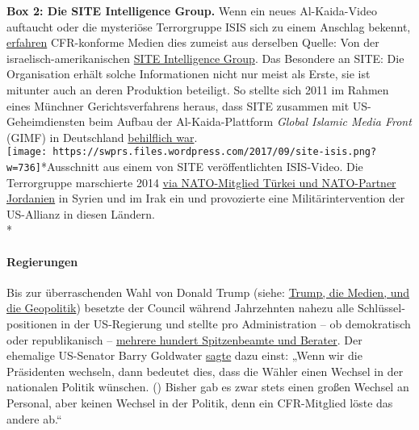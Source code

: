 \textbf{Box 2: Die SITE Intelligence Group.} Wenn ein neues
Al-Kaida-Video auftaucht oder die mysteriöse Terror­gruppe ISIS sich zu
einem Anschlag bekennt,
\href{https://www.hintergrund.de/globales/terrorismus/propaganda-und-wahrheit-die-botschaften-des-osama-bin-laden/}{erfahren}
CFR-konforme Medien dies zumeist aus derselben Quelle: Von der
israelisch-amerikanischen
\href{http://www.globalresearch.ca/who-is-behind-the-islamic-state-is-beheadings-probing-the-site-intelligence-group/5402082}{SITE
Intelligence Group}. Das Besondere an SITE: Die Organisation erhält
solche Informationen nicht nur meist als Erste, sie ist mitunter auch an
deren Produktion beteiligt. So stellte sich 2011 im Rahmen eines
Münchner Gerichtsverfahrens heraus, dass SITE zusammen mit
US-Geheimdiensten beim Aufbau der Al-Kaida-Plattform \emph{Global
Islamic Media Front} (GIMF) in Deutschland
\href{https://www.swr.de/blog/terrorismus/2011/09/09/eklat-im-gimf-verfahren-steuerte-das-fbi-die-zweite-generation/}{behilflich
war}.\\
\texttt{[image: https://swprs.files.wordpress.com/2017/09/site-isis.png?w=736]}*Ausschnitt
aus einem von SITE veröffentlichten ISIS-Video. Die Terrorgruppe
marschierte 2014
\href{https://journal-neo.org/2015/06/09/logistics-101-where-does-isis-get-its-guns/}{via
NATO-Mitglied Türkei und NATO-Partner Jordanien} in Syrien und im Irak
ein und provozierte eine Militärintervention der US-Allianz in diesen
Ländern.\\
*

\hypertarget{regierungen}{%
\paragraph{Regierungen}\label{regierungen}}

Bis zur überraschenden Wahl von Donald Trump (siehe:
\href{https://swprs.org/trump-medien-geopolitik/}{Trump, die Medien, und
die Geopolitik}) besetzte der Council während Jahrzehnten nahezu alle
Schlüssel­positionen in der US-Regierung und stellte pro Administration
-- ob demokratisch oder republikanisch --
\href{https://swprs.files.wordpress.com/2017/07/cfr-administration-members-1900-2014.pdf}{mehrere
hundert Spitzenbeamte und Berater}. Der ehemalige US-Senator Barry
Goldwater
\href{http://www.thirdworldtraveler.com/New_World_Order/Goldwater_NoApologies.html}{sagte}
dazu einst: „Wenn wir die Präsidenten wechseln, dann bedeutet dies, dass
die Wähler einen Wechsel in der nationalen Politik wünschen. () Bisher
gab es zwar stets einen großen Wechsel an Personal, aber keinen Wechsel
in der Politik, denn ein CFR-Mitglied löste das andere ab.``

